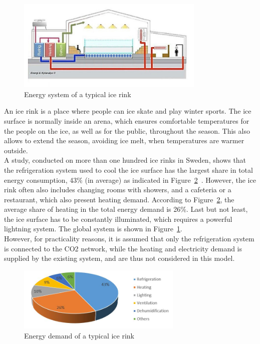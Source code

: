\documentclass{article}
\begin{document}
\begin{figure}[htp]
	\centering
	\includegraphics[width=0.8\textwidth]{IR_schema.JPG}
	\caption{Energy system of a typical ice rink~\cite{gronqvistComparativeLifecycleCost2016}}
	\label{fig:IR_schema}
\end{figure}

An ice rink is a place where people can ice skate and play winter sports. The ice surface is normally inside an arena, which ensures comfortable temperatures for the people on the ice, as well as for the public, throughout the season. This also allows to extend the season, avoiding ice melt, when temperatures are warmer outside.\\

A study, conducted on more than one hundred ice rinks in Sweden, shows that the refrigeration system used to cool the ice surface has the largest share in total energy consumption, 43\% (in average) as indicated in Figure~\ref{fig:IR_energyDemand}~\cite{kolasniewskiEvaluationModellingIce2017}.
However, the ice rink often also includes changing rooms with showers, and a cafeteria or a restaurant, which also present heating demand. According to Figure~\ref{fig:IR_energyDemand}, the average share of heating in the total energy demand is 26\%.
Last but not least, the ice surface has to be constantly illuminated, which requires a powerful lightning system. The global system is shown in Figure~\ref{fig:IR_schema}.\\

However, for practicality reasons, it is assumed that only the refrigeration system is connected to the CO2 network, while the heating and electricity demand is supplied by the existing system, and are thus not considered in this model.

\begin{figure}[htp]
	\centering
	\includegraphics[width=0.7\textwidth]{IR_energyDemand.JPG}
	\caption{Energy demand of a typical ice rink~\cite{kolasniewskiEvaluationModellingIce2017}}
	\label{fig:IR_energyDemand}
\end{figure}
\end{document}
